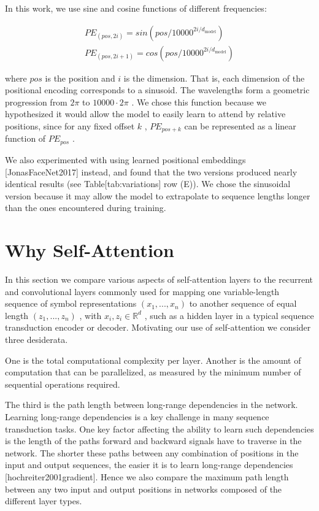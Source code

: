 \documentclass[11pt,a4paper]{article}
\begin{document}
In this work, we use sine and cosine functions of different frequencies:

$$\begin{align*}
    PE_{(pos,2i)} = sin(pos / 10000^{2i/d_{\text{model}}}) \\
    PE_{(pos,2i+1)} = cos(pos / 10000^{2i/d_{\text{model}}})
\end{align*}$$

where  $pos$  is the position and  $i$  is the dimension.  That is, each dimension of the positional encoding corresponds to a sinusoid.  The wavelengths form a geometric progression from  $2\pi$  to  $10000 \cdot 2\pi$ .  We chose this function because we hypothesized it would allow the model to easily learn to attend by relative positions, since for any fixed offset  $k$ ,  $PE_{pos+k}$  can be represented as a linear function of  $PE_{pos}$ .

We also experimented with using learned positional embeddings [JonasFaceNet2017] instead, and found that the two versions produced nearly identical results (see Table[tab:variations] row (E)).  We chose the sinusoidal version because it may allow the model to extrapolate to sequence lengths longer than the ones encountered during training.

\section{Why Self-Attention}

In this section we compare various aspects of self-attention layers to the recurrent and convolutional layers commonly used for mapping one variable-length sequence of symbol representations  $(x_1, ..., x_n)$  to another sequence of equal length  $(z_1, ..., z_n)$ , with  $x_i, z_i \in \mathbb{R}^d$ , such as a hidden layer in a typical sequence transduction encoder or decoder. Motivating our use of self-attention we consider three desiderata.

One is the total computational complexity per layer. Another is the amount of computation that can be parallelized, as measured by the minimum number of sequential operations required.

The third is the path length between long-range dependencies in the network. Learning long-range dependencies is a key challenge in many sequence transduction tasks. One key factor affecting the ability to learn such dependencies is the length of the paths forward and backward signals have to traverse in the network. The shorter these paths between any combination of positions in the input and output sequences, the easier it is to learn long-range dependencies [hochreiter2001gradient]. Hence we also compare the maximum path length between any two input and output positions in networks composed of the different layer types.
\end{document}
